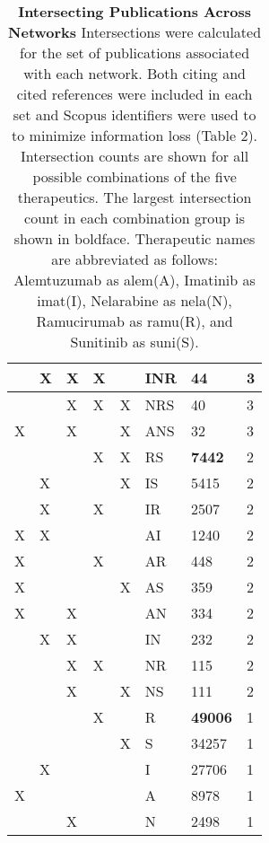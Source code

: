 \documentclass[10pt,letterpaper]{article}
\begin{document}
\begin{table}[!ht]
{\begin{tabular}{|l| l| l| l| l| l| l| l|}
\hline
& X & X & X &  & INR &  44 & 3 \\ 
\hline
 &  & X & X & X & NRS &  40 & 3 \\ 
\hline
X &  & X &  & X & ANS &  32 & 3 \\ 
\hline 
&  &  & X & X & RS & \textbf{7442} & 2 \\ 
\hline
& X &  &  & X & IS & 5415 & 2 \\ 
\hline
& X &  & X &  & IR & 2507 & 2 \\ 
\hline
X & X &  &  &  & AI & 1240 & 2 \\ 
\hline
X &  &  & X &  & AR & 448 & 2 \\ 
\hline
X &  &  &  & X & AS & 359 & 2 \\ 
\hline
X &  & X &  &  & AN & 334 & 2 \\ 
\hline 
& X & X &  &  & IN & 232 & 2 \\ 
\hline
&  & X & X &  & NR & 115 & 2 \\ 
\hline 
 &  & X &  & X & NS & 111 & 2 \\ 
\hline
&  &  & X &  & R & \textbf{49006} & 1 \\ 
\hline 
&  &  &  & X & S & 34257 & 1 \\ 
\hline 
& X &  &  &  & I & 27706 & 1 \\ 
\hline
X &  &  &  &  & A & 8978 & 1 \\ 
\hline
&  & X &  &  & N & 2498 & 1 \\ 
\hline
\end{tabular}}
\vspace{2.5 mm}
\caption{
{\bf Intersecting Publications Across Networks} Intersections were calculated for the set of publications associated with each network. Both citing and cited references were included in each set and  Scopus identifiers were used to to minimize information loss (Table 2). Intersection counts are shown for all possible combinations of the five therapeutics. The largest intersection count in each combination group is shown in boldface. Therapeutic names are abbreviated as follows: Alemtuzumab as alem(A), Imatinib as imat(I), Nelarabine as nela(N), Ramucirumab as ramu(R), and Sunitinib as suni(S). }

\label{table3}
\end{table}
\end{document}
